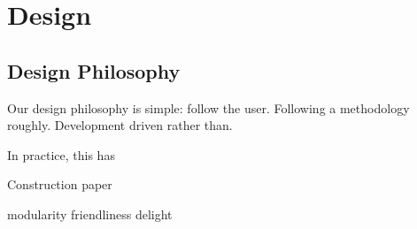 \chapter{Design}

\section{Design Philosophy}\label{design-philosophy}

Our design philosophy is simple: follow the user. Following a
methodology roughly. Development driven rather than.

In practice, this has

Construction paper

modularity friendliness delight
